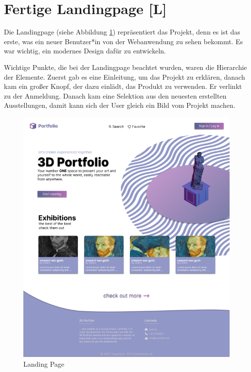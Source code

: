\section{Fertige Landingpage [L]}
Die Landingpage (siehe Abbildung \ref{fig:impl:finishedLandingpage}) repräsentiert das Projekt, denn es ist das erste, was ein neuer Benutzer*in von der Webanwendung zu sehen bekommt. Es war wichtig, ein modernes Design dafür zu entwickeln.

Wichtige Punkte, die bei der Landingpage beachtet wurden, waren die Hierarchie der Elemente. Zuerst gab es eine Einleitung, um das Projekt zu erklären, danach kam ein großer Knopf, der dazu einlädt, das Produkt zu verwenden. Er verlinkt zu der Anmeldung. Danach kam eine Selektion aus den neuesten erstellten Ausstellungen, damit kann sich der User gleich ein Bild vom Projekt machen.

\begin{figure}
    \centering
    \includegraphics[scale=.5]{pics/startingpage.png}
    \caption{Landing Page}
    \label{fig:impl:finishedLandingpage}
\end{figure}


